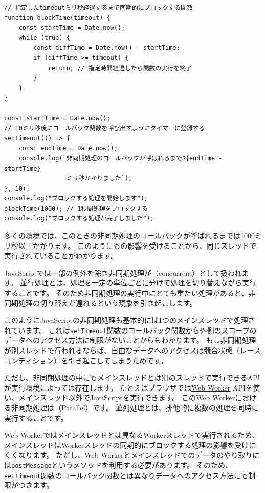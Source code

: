 \begin{lstlisting}
// 指定したtimeoutミリ秒経過するまで同期的にブロックする関数
function blockTime(timeout) { 
    const startTime = Date.now();
    while (true) {
        const diffTime = Date.now() - startTime;
        if (diffTime >= timeout) {
            return; // 指定時間経過したら関数の実行を終了
        }
    }
}

const startTime = Date.now();
// 10ミリ秒後にコールバック関数を呼び出すようにタイマーに登録する
setTimeout(() => {
    const endTime = Date.now();
    console.log(`非同期処理のコールバックが呼ばれるまで${endTime - startTime}
                 ミリ秒かかりました`);
}, 10);
console.log("ブロックする処理を開始します");
blockTime(1000); // 1秒間処理をブロックする
console.log("ブロックする処理が完了しました");
\end{lstlisting}

多くの環境では、このときの非同期処理のコールバックが呼ばれるまでは1000ミリ秒以上かかります。
このように\textbf{}も\textbf{}の影響を受けることから、同じスレッドで実行されていることがわかります。

JavaScriptでは一部の例外を除き非同期処理が\textbf{}（concurrent）として扱われます。
並行処理とは、処理を一定の単位ごとに分けて処理を切り替えながら実行することです。
そのため非同期処理の実行中にとても重たい処理があると、非同期処理の切り替えが遅れるという現象を引き起こします。

このようにJavaScriptの非同期処理も基本的には1つのメインスレッドで処理されています。
これは\texttt{setTimeout}関数のコールバック関数から外側のスコープのデータへのアクセス方法に制限がないことからもわかります。
もし非同期処理が別スレッドで行われるならば、自由なデータへのアクセスは競合状態（レースコンディション）を引き起こしてしまうためです。

ただし、非同期処理の中にもメインスレッドとは別のスレッドで実行できるAPIが実行環境によっては存在します。
たとえばブラウザでは\href{https://developer.mozilla.org/ja/docs/Web/API/Web_Workers_API/Using_web_workers}{Web
Worker} APIを使い、メインスレッド以外でJavaScriptを実行できます。
このWeb Workerにおける非同期処理は\textbf{}（Parallel）です。
並列処理とは、排他的に複数の処理を同時に実行することです。

Web
Workerではメインスレッドとは異なるWorkerスレッドで実行されるため、メインスレッドはWorkerスレッドの同期的にブロックする処理の影響を受けにくくなります。
ただし、Web
Workerとメインスレッドでのデータのやり取りには\texttt{postMessage}というメソッドを利用する必要があります。
そのため、\texttt{setTimeout}関数のコールバック関数とは異なりデータへのアクセス方法にも制限がつきます。

